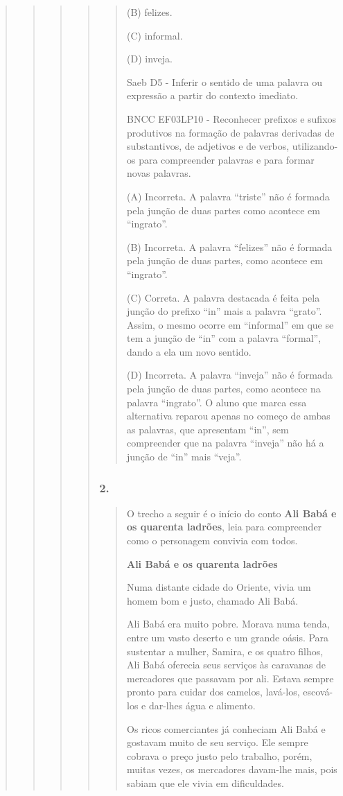 \begin{quote}
\begin{quote}
\begin{quote}
\begin{quote}
\begin{quote}
(B) felizes.

(C) informal.

(D) inveja.

Saeb D5 - Inferir o sentido de uma palavra ou expressão a partir do
contexto imediato.

BNCC EF03LP10 - Reconhecer prefixos e sufixos produtivos na formação de
palavras derivadas de substantivos, de adjetivos e de verbos,
utilizando-os para compreender palavras e para formar novas palavras.

(A) Incorreta. A palavra ``triste'' não é formada pela junção de duas
partes como acontece em ``ingrato''.

(B) Incorreta. A palavra ``felizes'' não é formada pela junção de duas
partes, como acontece em ``ingrato''.

(C) Correta. A palavra destacada é feita pela junção do prefixo ``in''
mais a palavra ``grato''. Assim, o mesmo ocorre em ``informal'' em que
se tem a junção de ``in'' com a palavra ``formal'', dando a ela um novo
sentido.

(D) Incorreta. A palavra ``inveja'' não é formada pela junção de duas
partes, como acontece na palavra ``ingrato''. O aluno que marca essa
alternativa reparou apenas no começo de ambas as palavras, que
apresentam ``in'', sem compreender que na palavra ``inveja'' não há a
junção de ``in'' mais ``veja''.
\end{quote}

\subsubsection{2. }\label{section-89}

\begin{quote}
O trecho a seguir é o início do conto \textbf{Ali Babá e os quarenta
ladrões}, leia para compreender como o personagem convivia com todos.

\textbf{Ali Babá e os quarenta ladrões}

Numa distante cidade do Oriente, vivia um homem bom e justo, chamado Ali
Babá.

Ali Babá era muito pobre. Morava numa tenda, entre um vasto deserto e um
grande oásis. Para sustentar a mulher, Samira, e os quatro filhos, Ali
Babá oferecia seus serviços às caravanas de mercadores que passavam por
ali. Estava sempre pronto para cuidar dos camelos, lavá-los, escová-los
e dar-lhes água e alimento.

Os ricos comerciantes já conheciam Ali Babá e gostavam muito de seu
serviço. Ele sempre cobrava o preço justo pelo trabalho, porém, muitas
vezes, os mercadores davam-lhe mais, pois sabiam que ele vivia em
dificuldades.


\end{quote}
\end{quote}
\end{quote}
\end{quote}
\end{quote}
